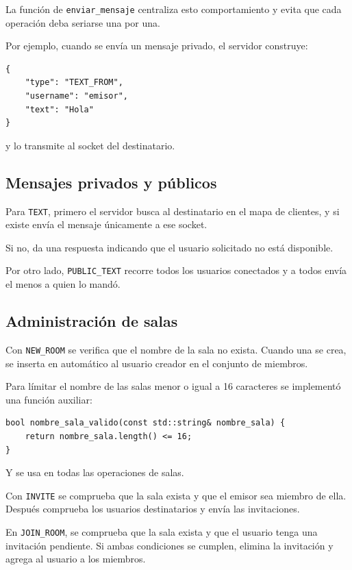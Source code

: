 \documentclass[12pt,letterpaper]{article}
\begin{document}
La función de \texttt{enviar\_mensaje} centraliza esto comportamiento y evita que cada operación deba seriarse una por una.

Por ejemplo, cuando se envía un mensaje privado, el servidor construye:

\begin{lstlisting}[style=jsonstyle]
{
    "type": "TEXT_FROM",
    "username": "emisor",
    "text": "Hola"
}
\end{lstlisting}

y lo transmite al socket del destinatario.

\subsection{Mensajes privados y públicos}

Para \texttt{TEXT}, primero el servidor busca al destinatario en el mapa de
clientes, y si existe envía el mensaje únicamente a ese socket.

Si no, da una respuesta indicando que el usuario solicitado no está disponible.

Por otro lado, \texttt{PUBLIC\_TEXT} recorre todos los usuarios conectados y a todos envía el menos a quien lo mandó.

\subsection{Administración de salas}

Con \texttt{NEW\_ROOM} se verifica que el nombre de la sala no exista.
Cuando una se crea, se inserta en automático al usuario creador en el conjunto de miembros.

Para límitar el nombre de las salas menor o igual a 16 caracteres se implementó una función
auxiliar:

\begin{lstlisting}[style=cppstyle]
bool nombre_sala_valido(const std::string& nombre_sala) {
    return nombre_sala.length() <= 16;
}
\end{lstlisting}

Y se usa en todas las operaciones de salas.

Con \texttt{INVITE} se comprueba que la sala exista y que el emisor sea miembro de ella. Después comprueba los usuarios destinatarios y
envía las invitaciones.

En \texttt{JOIN\_ROOM}, se comprueba que la sala exista y que el usuario tenga una invitación pendiente. Si ambas condiciones se cumplen,
elimina la invitación y agrega al usuario a los miembros.
\end{document}
